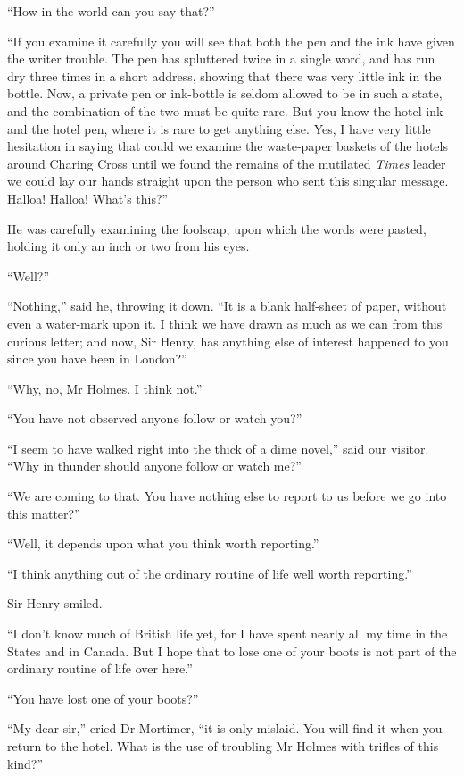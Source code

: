 \documentclass[paper=5.5in:8.5in,BCOR=7mm,twoside,DIV=calc,12pt,usegeometry,openany,chapterprefix,endperiod,headings=big]{scrbook} %
\begin{document}
\enquote{How in the world can you say that?}

\enquote{If you examine it carefully you will see that both the pen and the ink have given the writer trouble. The pen has spluttered twice in a single word, and has run dry three times in a short address, showing that there was very little ink in the bottle. Now, a private pen or ink-bottle is seldom allowed to be in such a state, and the combination of the two must be quite rare. But you know the hotel ink and the hotel pen, where it is rare to get anything else. Yes, I have very little hesitation in saying that could we examine the waste-paper baskets of the hotels around Charing Cross until we found the remains of the mutilated \textit{Times} leader we could lay our hands straight upon the person who sent this singular message. Halloa! Halloa! What's this?}

He was carefully examining the foolscap, upon which the words were pasted, holding it only an inch or two from his eyes.

\enquote{Well?}

\enquote{Nothing,} said he, throwing it down. \enquote{It is a blank half-sheet of paper, without even a water-mark upon it. I think we have drawn as much as we can from this curious letter; and now, Sir Henry, has anything else of interest happened to you since you have been in London?}

\enquote{Why, no, Mr Holmes. I think not.}

\enquote{You have not observed anyone follow or watch you?}

\enquote{I seem to have walked right into the thick of a dime novel,} said our visitor. \enquote{Why in thunder should anyone follow or watch me?}

\enquote{We are coming to that. You have nothing else to report to us before we go into this matter?}

\enquote{Well, it depends upon what you think worth reporting.}

\enquote{I think anything out of the ordinary routine of life well worth reporting.}

Sir Henry smiled.

\enquote{I don't know much of British life yet, for I have spent nearly all my time in the States and in Canada. But I hope that to lose one of your boots is not part of the ordinary routine of life over here.}

\enquote{You have lost one of your boots?}

\enquote{My dear sir,} cried Dr Mortimer, \enquote{it is only mislaid. You will find it when you return to the hotel. What is the use of troubling Mr Holmes with trifles of this kind?}
\end{document}
